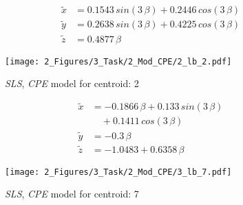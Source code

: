 \begin{figure}[!h]
    \begin{minipage}{.47\textwidth}
        \begin{equation}
            \begin{aligned}
            \tilde x &= 0.1543 \, sin(3 \, \beta) + 0.2446 \, cos(3 \, \beta) \\
            \tilde y &= 0.2638 \, sin(3 \, \beta) + 0.4225 \, cos(3 \, \beta) \\
            \tilde z &= 0.4877 \, \beta
        \end{aligned}
        \label{eq_28}
    \end{equation}
\end{minipage}%
\hfill
\begin{minipage}{.47\textwidth}
    \centering
    \texttt{[image: 2\_Figures/3\_Task/2\_Mod\_CPE/2\_lb\_2.pdf]}
    \caption{\emph{SLS}, \emph{CPE} model for centroid: 2 }
    \label{fig_46}    
\end{minipage}
\end{figure}

\begin{figure}[!h]
    \begin{minipage}{.47\textwidth}
      \begin{equation}
        \begin{aligned}
            \tilde x &= -0.1866 \, \beta + 0.133 \, sin(3 \, \beta) \\
            & \quad + 0.1411 \, cos(3 \, \beta) \\
            \tilde y &= -0.3 \, \beta \\
            \tilde z &= -1.0483+ 0.6358 \,\beta
        \end{aligned}
        \label{eq_29}
      \end{equation}
    \end{minipage}%
    \hfill
    \begin{minipage}{.47\textwidth}
        \centering
        \texttt{[image: 2\_Figures/3\_Task/2\_Mod\_CPE/3\_lb\_7.pdf]}
        \caption{\emph{SLS}, \emph{CPE} model for centroid: 7 }
        \label{fig_47}    
    \end{minipage}
\end{figure}


